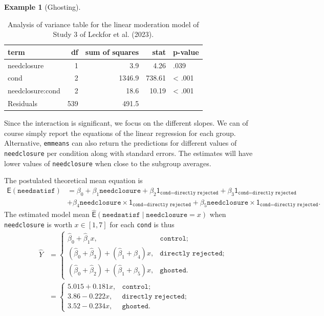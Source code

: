 \documentclass[
  11pt,
  letterpaper,
]{scrbook}
\theoremstyle{definition}
\theoremstyle{definition}
\newtheorem{example}{Example}[chapter]
\theoremstyle{remark}
\begin{document}
\begin{example}[Ghosting]
\begin{longtable}[]
\end{longtable}

\begin{longtable}[]{@{}lrrrl@{}}

\caption{\label{tbl-testsmoder2}Analysis of variance table for the
linear moderation model of Study 3 of Leckfor et al. (2023).}

\tabularnewline

\toprule\noalign{}
term & df & sum of squares & stat & p-value \\
\midrule\noalign{}
\endhead
\bottomrule\noalign{}
\endlastfoot
needclosure & 1 & 3.9 & 4.26 & .039 \\
cond & 2 & 1346.9 & 738.61 & \textless{} .001 \\
needclosure:cond & 2 & 18.6 & 10.19 & \textless{} .001 \\
Residuals & 539 & 491.5 & & \\

\end{longtable}

Since the interaction is significant, we focus on the different slopes.
We can of course simply report the equations of the linear regression
for each group. Alternative, \texttt{emmeans} can also return the
predictions for different values of \texttt{needclosure} per condition
along with standard errors. The estimates will have lower values of
\texttt{needclosure} when close to the subgroup averages.

The postulated theoretical mean equation is \begin{align*}
\mathsf{E}(\texttt{needsatisf}) &= \beta_0 + \beta_1\texttt{needclosure} + \beta_2 \mathsf{1}_{\texttt{cond=directly rejected}} +\beta_3 \mathsf{1}_{\texttt{cond=directly rejected}} \\&+ \beta_4 \texttt{needclosure} \times \mathsf{1}_{\texttt{cond=directly rejected}} +\beta_5 \texttt{needclosure} \times\mathsf{1}_{\texttt{cond=directly rejected}}.
\end{align*} The estimated model mean
\(\widehat{\mathsf{E}}(\texttt{needsatisf} \mid \texttt{needclosure}=x)\)
when \texttt{needclosure} is worth \(x \in [1,7]\) for each
\texttt{cond} is thus \begin{align*}
\widehat{Y} & = \begin{cases}
\widehat{\beta}_0 + \widehat{\beta}_1x, & \texttt{control};\\
(\widehat{\beta}_0 + \widehat{\beta}_3) + (\widehat{\beta}_1 + \beta_4)x , & \texttt{directly rejected};\\
(\widehat{\beta}_0 + \widehat{\beta}_2) + (\widehat{\beta}_1 + \beta_5)x, & \texttt{ghosted}.
\end{cases} \\&= \begin{cases}
5.015 + 0.181 x, & \texttt{control};\\
 3.86 -0.222x, & \texttt{directly rejected};\\
3.52 -0.234x, & \texttt{ghosted}.
\end{cases}
\end{align*}


\end{example}
\end{document}
